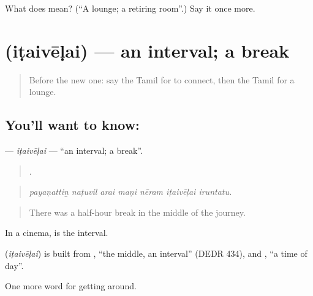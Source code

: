 \begin{tcolorbox}[breakable,colback=teal!4,colframe=teal!35!black,title={Before you move on}]
What does  mean? (\textquotedblleft{}A lounge; a retiring room\textquotedblright{}.) Say it once more.
\end{tcolorbox}
\section[\texorpdfstring{\ta{இடைவேளை} (iṭaivēḷai)}{இடைவேளை (iṭaivēḷai)}]{ (iṭaivēḷai) — an interval; a break}

\label{lesson:TA-C405-itaivelai}



\begin{quote}
Before the new one: say the Tamil for to connect, then the Tamil for a lounge.
\end{quote}

\subsection*{You'll want to know: }
\textbf{} — \emph{iṭaivēḷai} — \textquotedblleft{}an interval; a break\textquotedblright{}.

\begin{quote}
      .
\end{quote}

\begin{quote}
\emph{payaṇattiṉ naṭuvil arai maṇi nēram iṭaivēḷai iruntatu.}
\end{quote}

\begin{quote}
There was a half-hour break in the middle of the journey.
\end{quote}

In a cinema,  is the interval.

\begin{cousinweb}
\textbf{} (\emph{iṭaivēḷai}) is built from , \textquotedblleft{}the middle, an interval\textquotedblright{} (DEDR 434), and , \textquotedblleft{}a time of day\textquotedblright{}.
\end{cousinweb}

\begin{grammarlens}[title={What you've built}]
One more word for getting around.
\end{grammarlens}

